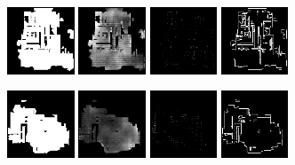 \begin{figure}[h!]
\begin{minipage}[b]{\linewidth}
	\begin{center}
		\includegraphics[width=2cm]{figures/results/samples/uncond/sample17_map_floormap_generated.png}
		\includegraphics[width=2cm]{figures/results/samples/uncond/sample17_map_heightmap_generated.png}
		\includegraphics[width=2cm]{figures/results/samples/uncond/sample17_map_thingsmap_generated.png}
		\includegraphics[width=2cm]{figures/results/samples/uncond/sample17_map_wallmap_generated.png}
	\end{center}
	
	\begin{center}
		\includegraphics[width=2cm]{figures/results/samples/uncond/sample18_map_floormap_generated.png}
		\includegraphics[width=2cm]{figures/results/samples/uncond/sample18_map_heightmap_generated.png}
		\includegraphics[width=2cm]{figures/results/samples/uncond/sample18_map_thingsmap_generated.png}
		\includegraphics[width=2cm]{figures/results/samples/uncond/sample18_map_wallmap_generated.png}
	\end{center}
	

\end{minipage}
\end{figure}

